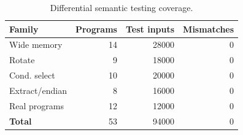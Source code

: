 \begin{table}[t]
  \centering
  \caption{Differential semantic testing coverage. }
  \label{tab:rq4-semantic}
  \small
  \begin{tabular}{lrrr}
    \toprule
    Family & Programs & Test inputs & Mismatches \\
    \midrule
    Wide memory & 14 & 28000 & 0 \\
    Rotate & 9 & 18000 & 0 \\
    Cond. select & 10 & 20000 & 0 \\
    Extract/endian & 8 & 16000 & 0 \\
    Real programs & 12 & 12000 & 0 \\
    \textbf{Total} & 53 & 94000 & 0 \\
    \bottomrule
  \end{tabular}
\end{table}

